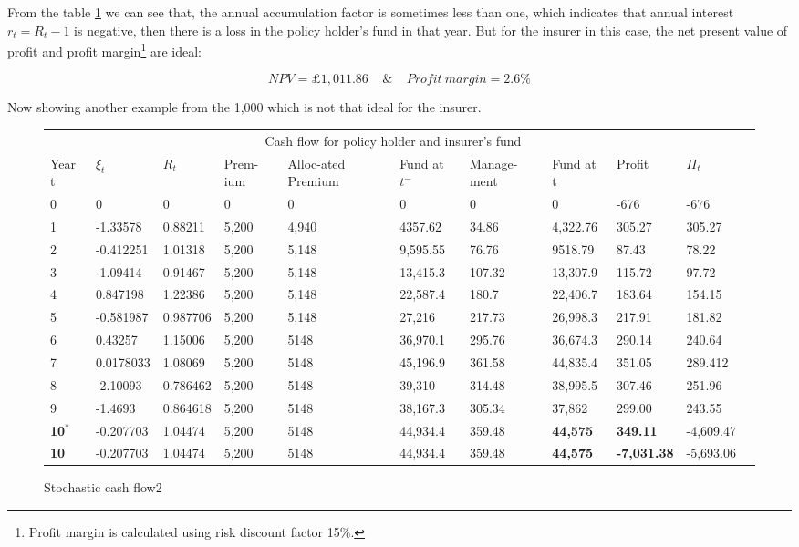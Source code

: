 \documentclass{report}
\begin{document}
From the table \ref{stoch-cashflow} we can see that, the annual accumulation factor is sometimes less than one, which indicates that annual interest $r_t = R_t - 1$ is negative, then there is a loss in the policy holder's fund in that year. But for the insurer in this case, the net present value of profit and profit margin\footnote{Profit margin is calculated using risk discount factor 15\%.} are ideal: 

\[
NPV=\pounds 1,011.86\ \ \ \   \   \& \    \ \ \ \       Profit \  margin = 2.6\%
\]

Now showing another example from the 1,000 which is not that ideal for the insurer.

\begin{figure}[H]
    \centering
\begin{tabular}{p{0.5cm} p{1.5cm} p{1.3cm} p{1cm} p{1.5cm} p{1.2cm} p{1.3cm} p{1.3cm}p{1.6cm}p{1.5cm}p{1.3cm} }
\toprule
\multicolumn{10}{c}{Cash flow for policy holder and insurer's fund} \\
\cmidrule(r){3-8}

Year t & $\xi_t$ &$R_t$ & Prem-ium & Alloc-ated Premium & Fund at $t^-$ &Manage-ment & Fund at t& Profit& $\Pi_t$ \\
\midrule
0&0&0&0&0&0&0&0&-676&-676\\
1&-1.33578&0.88211&5,200&4,940&4357.62&34.86&4,322.76&305.27&305.27\\
2&-0.412251&1.01318&5,200&5,148&9,595.55&76.76&9518.79&87.43&78.22\\
3&-1.09414&0.91467&5,200&5,148&13,415.3&107.32&13,307.9&115.72&97.72\\
4&0.847198&1.22386&5,200&5,148&22,587.4&180.7&22,406.7&183.64&154.15\\
5&-0.581987&0.987706&5,200&5,148&27,216&217.73&26,998.3&217.91&181.82\\
6&0.43257&1.15006&5,200&5148&36,970.1&295.76&36,674.3&290.14&240.64\\
7&0.0178033&1.08069&5,200&5148&45,196.9&361.58&44,835.4&351.05&289.412\\
8&-2.10093&0.786462&5,200&5148&39,310&314.48&38,995.5&307.46&251.96\\
9&-1.4693&0.864618&5,200&5148&38,167.3&305.34&37,862&299.00&243.55\\
\textbf{10$^*$}&-0.207703&1.04474&5,200&5148&44,934.4&359.48&\textbf{44,575}&\textbf{349.11}&-4,609.47\\
\textbf{10}&-0.207703&1.04474&5,200&5148&44,934.4&359.48&\textbf{44,575}&\textbf{-7,031.38}&-5,693.06\\

\bottomrule
\end{tabular}
\caption{Stochastic cash flow2}
\label{stoch-cashflow}
\end{figure}
\end{document}
